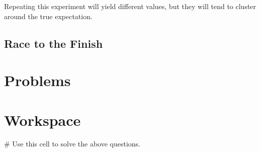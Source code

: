 \documentclass{ximera}
\begin{document}
Repeating this experiment will yield different values, but they will tend to cluster around the true expectation. 

\subsection{}

\subsection{Race to the Finish}

\section{Problems}

\begin{question}
\end{question}

\begin{question}
\end{question}

\begin{question}
\end{question}

\section{Workspace}

\begin{sageCell}
# Use this cell to solve the above questions.
\end{sageCell}
\end{document}
